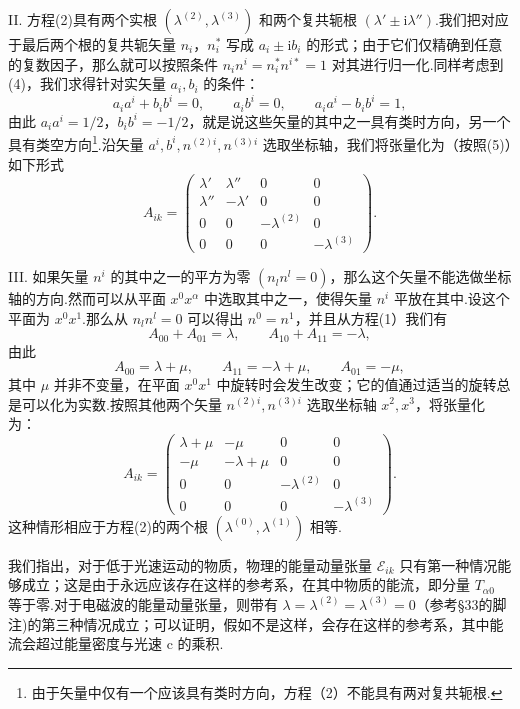 \begin{xiti}
II. 方程(2)具有两个实根 $(\lambda^{(2)},\lambda^{(3)})$ 和两个复共轭根 $(\lambda'\pm\mathrm{i}\lambda'')$.我们把对应于最后两个根的复共轭矢量 $n_i$，$n_i^{*}$ 写成 $a_i\pm\mathrm{i}b_i$ 的形式；由于它们仅精确到任意的复数因子，那么就可以按照条件 $n_in^i=n_i^{*}n^{i*}=1$ 对其进行归一化.同样考虑到(4)，我们求得针对实矢量 $a_i,b_i$ 的条件：
\begin{equation*}
  a_ia^i+b_ib^i=0,\qquad a_ib^i=0,\qquad
  a_ia^i-b_ib^i=1,
\end{equation*}
由此 $a_ia^i=1/2$，$b_ib^i=-1/2$，就是说这些矢量的其中之一具有类时方向，另一个具有类空方向\footnote{由于矢量中仅有一个应该具有类时方向，方程（2）不能具有两对复共轭根.}.沿矢量 $a^i,b^i,n^{(2)i},n^{(3)i}$ 选取坐标轴，我们将张量化为（按照(5)）如下形式
\begin{equation*}
  A_{ik}=
  \begin{pmatrix}
    \lambda' & \lambda'' & 0 & 0\\
    \lambda'' & -\lambda' & 0 & 0\\
    0 & 0 & -\lambda^{(2)} & 0\\
    0 & 0 & 0 & -\lambda^{(3)}
  \end{pmatrix}.
\tag{7}\end{equation*}

III. 如果矢量 $n^i$ 的其中之一的平方为零 $(n_ln^l=0)$，那么这个矢量不能选做坐标轴的方向.然而可以从平面 $x^0x^{\alpha}$ 中选取其中之一，使得矢量 $n^i$ 平放在其中.设这个平面为 $x^0x^1$.那么从 $n_ln^l=0$ 可以得出 $n^0=n^1$，并且从方程(1）我们有
\begin{equation*}
  A_{00}+A_{01}=\lambda,\qquad A_{10}+A_{11}=-\lambda,
\end{equation*}
由此
\begin{equation*}
  A_{00}=\lambda+\mu,\qquad A_{11}=-\lambda+\mu,\qquad A_{01}=-\mu,
\end{equation*}
其中 $\mu$ 并非不变量，在平面 $x^0x^1$ 中旋转时会发生改变；它的值通过适当的旋转总是可以化为实数.按照其他两个矢量 $n^{(2)i},n^{(3)i}$ 选取坐标轴 $x^2,x^3$，将张量化为：
\begin{equation*}
  A_{ik}=
  \begin{pmatrix}
    \lambda+\mu & -\mu & 0 & 0\\
    -\mu & -\lambda+\mu & 0 & 0\\
    0 & 0 & -\lambda^{(2)} & 0\\
    0 & 0 & 0 & -\lambda^{(3)}
  \end{pmatrix}.
\tag{8}\end{equation*}
这种情形相应于方程(2)的两个根 $(\lambda^{(0)},\lambda^{(1)})$ 相等.

我们指出，对于低于光速运动的物质，物理的能量动量张量 $\mathcal{E}_{ik}$ 只有第一种情况能够成立；这是由于永远应该存在这样的参考系，在其中物质的能流，即分量 $T_{\alpha 0}$ 等于零.对于电磁波的能量动量张量，则带有 $\lambda=\lambda^{(2)}=\lambda^{(3)}=0$（参考§33的脚注)的第三种情况成立；可以证明，假如不是这样，会存在这样的参考系，其中能流会超过能量密度与光速 c 的乘积.

\end{xiti}

